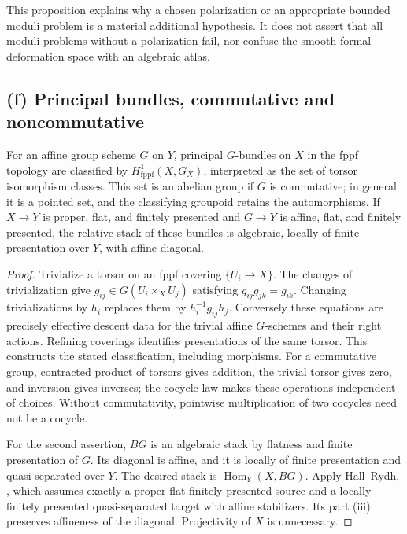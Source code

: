 This proposition explains why a chosen polarization or an appropriate
bounded moduli problem is a material additional hypothesis. It does not
assert that all moduli problems without a polarization fail, nor confuse
the smooth formal deformation space with an algebraic atlas.

\subsection{(f) Principal bundles, commutative and noncommutative}

\begin{theorem}
\label{geo-Kf}
For an affine group scheme $G$ on $Y$, principal $G$-bundles on $X$ in the
fppf topology are classified by $H^1_{\mathrm{fppf}}(X,G_X)$, interpreted
as the set of torsor isomorphism classes. This set is an abelian group if
$G$ is commutative; in general it is a pointed set, and the classifying
groupoid retains the automorphisms.
If $X\to Y$ is proper, flat, and finitely presented and $G\to Y$ is
affine, flat, and finitely presented, the relative stack of these bundles
is algebraic, locally of finite presentation over $Y$, with affine diagonal.
\end{theorem}
\begin{proof}
Trivialize a torsor on an fppf covering $\{U_i\to X\}$. The changes of
trivialization give $g_{ij}\in G(U_i\times_XU_j)$ satisfying
$g_{ij}g_{jk}=g_{ik}$. Changing trivializations by $h_i$ replaces them by
$h_i^{-1}g_{ij}h_j$. Conversely these equations are precisely effective
descent data for the trivial affine $G$-schemes and their right actions.
Refining coverings identifies presentations of the same torsor. This
constructs the stated classification, including morphisms. For a
commutative group, contracted product of torsors gives addition, the
trivial torsor gives zero, and inversion gives inverses; the cocycle law
makes these operations independent of choices. Without commutativity,
pointwise multiplication of two cocycles need not be a cocycle.

For the second assertion, $BG$ is an algebraic stack by flatness and finite
presentation of $G$. Its diagonal is affine, and it is locally of finite
presentation and quasi-separated over $Y$. The desired stack is
$\operatorname{Hom}_Y(X,BG)$. Apply Hall--Rydh,
\cite[Theorem 1.2, p.~1634]{HallRydh2019}, which assumes exactly a proper
flat finitely presented source and a locally finitely presented
quasi-separated target with affine stabilizers. Its part (iii) preserves
affineness of the diagonal. Projectivity of $X$ is unnecessary.
\end{proof}

